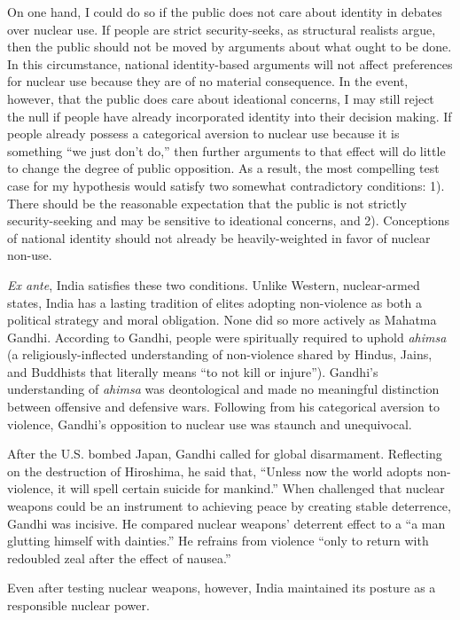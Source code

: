 \documentclass[12pt]{article}
\begin{document}
On one hand, I could do so if the public does not care about identity in debates over nuclear use. If people are strict security-seeks, as structural realists argue, then the public should not be moved by arguments about what ought to be done. In this circumstance, national identity-based arguments will not affect preferences for nuclear use because they are of no material consequence. In the event, however, that the public does care about ideational concerns, I may still reject the null if people have already incorporated identity into their decision making. If people already possess a categorical aversion to nuclear use because it is something “we just don't do,” then further arguments to that effect will do little to change the degree of public opposition. As a result, the most compelling test case for my hypothesis would satisfy two somewhat contradictory conditions: 1). There should be the reasonable expectation that the public is not strictly security-seeking and may be sensitive to ideational concerns, and 2). Conceptions of national identity should not already be heavily-weighted in favor of nuclear non-use.

\textit{Ex ante}, India satisfies these two conditions. Unlike Western, nuclear-armed states, India has a lasting tradition of elites adopting non-violence as both a political strategy and moral obligation. None did so more actively as Mahatma Gandhi. According to Gandhi, people were spiritually required to uphold \textit{ahimsa} (a religiously-inflected understanding of non-violence shared by Hindus, Jains, and Buddhists that literally means “to not kill or injure”). Gandhi's understanding of \textit{ahimsa} was deontological and made no meaningful distinction between offensive and defensive wars. Following from his categorical aversion to violence, Gandhi's opposition to nuclear use was staunch and unequivocal.

After the U.S. bombed Japan, Gandhi called for global disarmament. Reflecting on the destruction of Hiroshima, he said that, “Unless now the world adopts non-violence, it will spell certain suicide for mankind.” When challenged that nuclear weapons could be an instrument to achieving peace by creating stable deterrence, Gandhi was incisive. He compared nuclear weapons' deterrent effect to a “a man glutting himself with dainties.” He refrains from violence “only to return with redoubled zeal after the effect of nausea.”


 Even after testing nuclear weapons, however, India maintained its posture as a responsible nuclear power. \\
\end{document}
